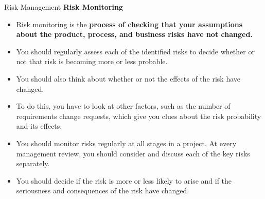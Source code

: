 \documentclass{beamer}
\begin{document}
\begin{frame}{Risk Management}
	\textbf{Risk Monitoring}
	\begin{itemize}
		\item Risk monitoring is the \textbf{process of checking that your assumptions about the product, process, and 
			business risks have not changed. }
		\item You should regularly assess each of the identified risks to decide whether or not that risk is becoming 
		more or less probable. 
	\item You should also think about whether or not the effects of the risk have changed. 
		\item To do this, you have to look at other factors, such as the number of requirements change requests, 
		which give you clues about the risk probability and its effects.
		\item You should monitor risks regularly at all stages in a project. At every management review, you should 
		consider and discuss each of the key risks separately. 
		\item You should decide if the risk is more or less likely to arise and if the seriousness and consequences of 
		the risk have changed.
	\end{itemize}
\end{frame}
\end{document}
